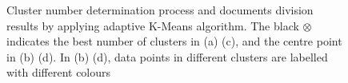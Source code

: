 \documentclass[runningheads,a4paper]{llncs}
\begin{document}
\begin{figure}[htb]
	\caption{Cluster number determination process and documents division results by applying adaptive K-Means algorithm. The black $\otimes$ indicates the best number of clusters in (a) (c), and the centre point in (b) (d). In (b) (d), data points in different clusters are labelled with different colours}
	\label{cluster}
\end{figure}
\end{document}
